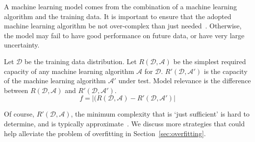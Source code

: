 A machine learning model comes from the combination of a machine learning algorithm and the training data.
It is important to ensure that
the adopted machine learning algorithm be not over-complex than just needed~.
Otherwise, the model may fail to have good performance on future data, or have very large uncertainty.
\begin{definition}
Let $\mathcal{D}$ be the training data distribution.
Let $R(\mathcal{D}, \mathcal{A})$ be the simplest required capacity of any machine learning algorithm $\mathcal{A}$ for $\mathcal{D}$.
$R'(\mathcal{D},\mathcal{A'})$ is the capacity of the machine learning algorithm $\mathcal{A'}$ under test.
Model relevance is the difference between 
$R(\mathcal{D}, \mathcal{A})$ and $R'(\mathcal{D}, \mathcal{A'})$.
\begin{equation}
f = |(R(\mathcal{D}, \mathcal{A})-R'(\mathcal{D}, \mathcal{A'})|
\end{equation}	
\end{definition}
Of course, $R'(\mathcal{D}, \mathcal{A})$, the minimum complexity that is `just sufficient' is hard to determine, and is typically approximate~.
We discuss more strategies that could help alleviate the problem of overfitting in Section~\ref{sec:overfitting}.

